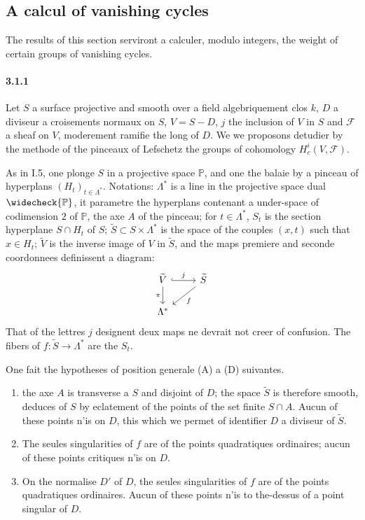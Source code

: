 \documentclass[12pt,a4paper]{article}
\theoremstyle{plain}
\theoremstyle{definition}
\theoremstyle{remark}
\newcommand{\PP}{{\mathbb{P}}}
\begin{document}
\subsection{A calcul of vanishing cycles}

The results of this section serviront a calculer, modulo integers, the weight of certain groups of vanishing cycles.

\paragraph{3.1.1}
Let $S$ a surface projective and smooth over a field algebriquement clos $k$, $D$ a diviseur a croisements normaux on $S$, $V = S - D$, $j$ the inclusion of $V$ in $S$ and $\mathscr{F}$ a sheaf on $V$, moderement ramifie the long of $D$. We we proposons detudier by the methode of the pinceaux of Lefschetz the groups of cohomology $H_c^i(V, \mathscr{F})$.

As in I.5, one plonge $S$ in a projective space $\PP$, and one the balaie by a pinceau of hyperplans $(H_t)_{t \in \Lambda^*}$. Notations: $\Lambda^*$ is a line in the projective space dual $\widecheck{\PP}$, it parametre the hyperplans contenant a under-space of codimension $2$ of $\PP$, the axe $A$ of the pinceau; for $t \in \Lambda^*$, $S_t$ is the section hyperplane $S \cap H_t$ of $S$; $\widetilde{S} \subset S \times \Lambda^*$ is the space of the couples $(x,t)$ such that $x \in H_t$; $\widetilde{V}$ is the inverse image of $V$ in $\widetilde{S}$, and the maps premiere and seconde coordonnees definissent a diagram:
\begin{equation}\label{eq:3.1.1.1}
\begin{tikzcd}
\widetilde{V} \arrow[r, hook, "j"] \arrow[d, "\pi"'] & \widetilde{S} \arrow[dl, "f"] \\
\Lambda^* &
\end{tikzcd}
\end{equation}
That of the lettres $j$ designent deux maps ne devrait not creer of confusion. The fibers of $f : \widetilde{S} \to \Lambda^*$ are the $S_t$.

One fait the hypotheses of position generale (A) a (D) suivantes.
\begin{enumerate}[label=(\Alph*)]
\item the axe $A$ is transverse a $S$ and disjoint of $D$; the space $\widetilde{S}$ is therefore smooth, deduces of $S$ by eclatement of the points of the set finite $S \cap A$. Aucun of these points n'is on $D$, this which we permet of identifier $D$ a diviseur of $\widetilde{S}$.
\item The seules singularities of $f$ are of the points quadratiques ordinaires; aucun of these points critiques n'is on $D$.
\item On the normalise $D'$ of $D$, the seules singularities of $f$ are of the points quadratiques ordinaires. Aucun of these points n'is to the-dessus of a point singular of $D$.
\end{enumerate}
\end{document}
